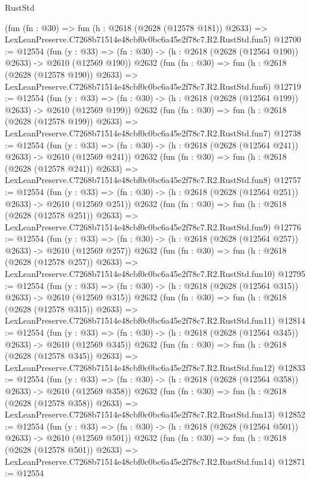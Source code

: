 \begin{lexlean}{RustStd}
\begin{coremodule}
    (fun (fn : @30) =>
    fun (h : @2618 (@2628 (@12578 @181)) @2633) =>
    LexLeanPreserve.C7268b71514e48cbf0c0bc6a45e2f78c7.R2.RustStd.fun5)
@12700 := @12554
    (fun (y : @33) => (fn : @30) -> (h : @2618 (@2628 (@12564 @190)) @2633) -> @2610 (@12569 @190))
    @2632
    (fun (fn : @30) =>
    fun (h : @2618 (@2628 (@12578 @190)) @2633) =>
    LexLeanPreserve.C7268b71514e48cbf0c0bc6a45e2f78c7.R2.RustStd.fun6)
@12719 := @12554
    (fun (y : @33) => (fn : @30) -> (h : @2618 (@2628 (@12564 @199)) @2633) -> @2610 (@12569 @199))
    @2632
    (fun (fn : @30) =>
    fun (h : @2618 (@2628 (@12578 @199)) @2633) =>
    LexLeanPreserve.C7268b71514e48cbf0c0bc6a45e2f78c7.R2.RustStd.fun7)
@12738 := @12554
    (fun (y : @33) => (fn : @30) -> (h : @2618 (@2628 (@12564 @241)) @2633) -> @2610 (@12569 @241))
    @2632
    (fun (fn : @30) =>
    fun (h : @2618 (@2628 (@12578 @241)) @2633) =>
    LexLeanPreserve.C7268b71514e48cbf0c0bc6a45e2f78c7.R2.RustStd.fun8)
@12757 := @12554
    (fun (y : @33) => (fn : @30) -> (h : @2618 (@2628 (@12564 @251)) @2633) -> @2610 (@12569 @251))
    @2632
    (fun (fn : @30) =>
    fun (h : @2618 (@2628 (@12578 @251)) @2633) =>
    LexLeanPreserve.C7268b71514e48cbf0c0bc6a45e2f78c7.R2.RustStd.fun9)
@12776 := @12554
    (fun (y : @33) => (fn : @30) -> (h : @2618 (@2628 (@12564 @257)) @2633) -> @2610 (@12569 @257))
    @2632
    (fun (fn : @30) =>
    fun (h : @2618 (@2628 (@12578 @257)) @2633) =>
    LexLeanPreserve.C7268b71514e48cbf0c0bc6a45e2f78c7.R2.RustStd.fun10)
@12795 := @12554
    (fun (y : @33) => (fn : @30) -> (h : @2618 (@2628 (@12564 @315)) @2633) -> @2610 (@12569 @315))
    @2632
    (fun (fn : @30) =>
    fun (h : @2618 (@2628 (@12578 @315)) @2633) =>
    LexLeanPreserve.C7268b71514e48cbf0c0bc6a45e2f78c7.R2.RustStd.fun11)
@12814 := @12554
    (fun (y : @33) => (fn : @30) -> (h : @2618 (@2628 (@12564 @345)) @2633) -> @2610 (@12569 @345))
    @2632
    (fun (fn : @30) =>
    fun (h : @2618 (@2628 (@12578 @345)) @2633) =>
    LexLeanPreserve.C7268b71514e48cbf0c0bc6a45e2f78c7.R2.RustStd.fun12)
@12833 := @12554
    (fun (y : @33) => (fn : @30) -> (h : @2618 (@2628 (@12564 @358)) @2633) -> @2610 (@12569 @358))
    @2632
    (fun (fn : @30) =>
    fun (h : @2618 (@2628 (@12578 @358)) @2633) =>
    LexLeanPreserve.C7268b71514e48cbf0c0bc6a45e2f78c7.R2.RustStd.fun13)
@12852 := @12554
    (fun (y : @33) => (fn : @30) -> (h : @2618 (@2628 (@12564 @501)) @2633) -> @2610 (@12569 @501))
    @2632
    (fun (fn : @30) =>
    fun (h : @2618 (@2628 (@12578 @501)) @2633) =>
    LexLeanPreserve.C7268b71514e48cbf0c0bc6a45e2f78c7.R2.RustStd.fun14)
@12871 := @12554

\end{coremodule}
\end{lexlean}
